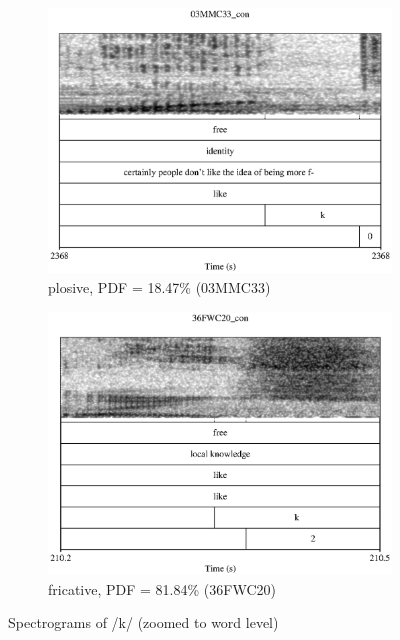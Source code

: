 	\begin{figure}[h!]
		\centering
		\begin{subfigure}{0.75\textwidth}
			\centering
			\includegraphics[width=\textwidth]{figures/like_plosive}
			\caption{plosive, PDF = 18.47\% (03MMC33)}
		\end{subfigure}
		\begin{subfigure}{0.75\textwidth}
			\centering
			\includegraphics[width=\textwidth]{figures/like_fricative}
			\caption{fricative, PDF = 81.84\% (36FWC20)}
		\end{subfigure}
		\caption{Spectrograms of /k/ (zoomed to word level)}
		\label{fig.automatic.consonants}
	\end{figure}
	
